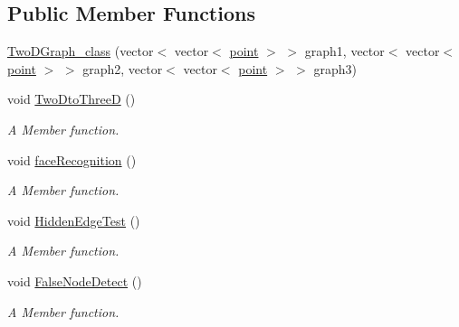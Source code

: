 \subsection*{Public Member Functions}
\begin{DoxyCompactItemize}
\item 
\hyperlink{classTwoDGraph__class_aa666c42d1e81f8da8cc9229f46c572f5}{Two\+D\+Graph\+\_\+class} (vector$<$ vector$<$ \hyperlink{structpoint}{point} $>$ $>$ graph1, vector$<$ vector$<$ \hyperlink{structpoint}{point} $>$ $>$ graph2, vector$<$ vector$<$ \hyperlink{structpoint}{point} $>$ $>$ graph3)
\item 
void \hyperlink{classTwoDGraph__class_a48222790dda1c34caf1366ce1cc0ce1d}{Two\+Dto\+ThreeD} ()
\begin{DoxyCompactList}\small\item\em A Member function. \end{DoxyCompactList}\item 
void \hyperlink{classTwoDGraph__class_af0b7cb652fec315e79e0f4826c64ae6d}{face\+Recognition} ()
\begin{DoxyCompactList}\small\item\em A Member function. \end{DoxyCompactList}\item 
void \hyperlink{classTwoDGraph__class_a551441ccdbceddd7c5d7df8c3a0a3e04}{Hidden\+Edge\+Test} ()
\begin{DoxyCompactList}\small\item\em A Member function. \end{DoxyCompactList}\item 
void \hyperlink{classTwoDGraph__class_aac6062b9859be331a44d1fe61036d5a1}{False\+Node\+Detect} ()
\begin{DoxyCompactList}\small\item\em A Member function. \end{DoxyCompactList}\end{DoxyCompactItemize}
